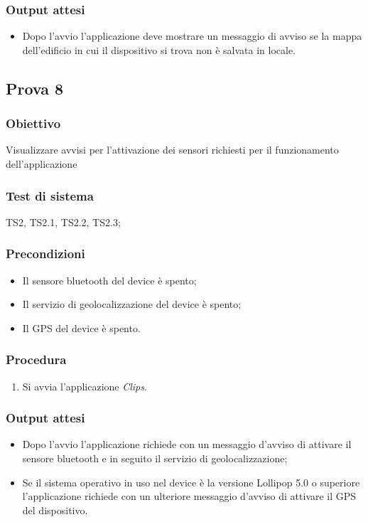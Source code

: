 \documentclass[../SperimentazioniPratiche.tex]{subfiles}
\begin{document}
	\subsubsection{Output attesi}
		\begin{itemize}
		\item Dopo l'avvio l'applicazione deve mostrare un messaggio di avviso se la mappa dell'edificio in cui il dispositivo si trova non è salvata in locale.
		\end{itemize}
	
	
	

\newpage	
\subsection{Prova 8} %
\label{subsec:Prova8}
	
	\subsubsection{Obiettivo}
		Visualizzare avvisi per l'attivazione dei sensori richiesti per il funzionamento dell'applicazione
		
	\subsubsection{Test di sistema}
		TS2, TS2.1, TS2.2, TS2.3;
		
	\subsubsection{Precondizioni}
		\begin{itemize}
			\item Il sensore bluetooth del device è spento;
			\item Il servizio di geolocalizzazione del device è spento;
			\item Il GPS del device è spento.
		\end{itemize}
		
	\subsubsection{Procedura}
		\begin{enumerate}
		\item Si avvia l'applicazione \textit{Clips}.
		\end{enumerate}
		
	\subsubsection{Output attesi}
		\begin{itemize}
		\item Dopo l'avvio l'applicazione richiede con un messaggio d'avviso di attivare il sensore bluetooth e in seguito il servizio di geolocalizzazione;
		\item Se il sistema operativo in uso nel device è la versione Lollipop 5.0 o superiore l'applicazione richiede con un ulteriore messaggio d'avviso di attivare il GPS del dispositivo.
		\end{itemize}
		
\end{document}
